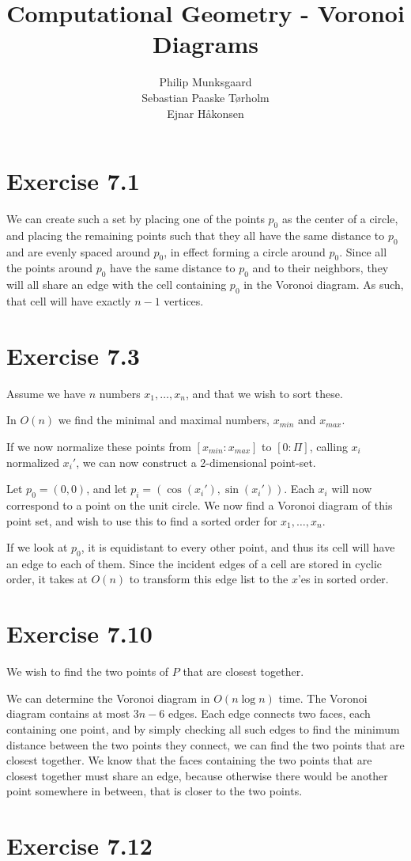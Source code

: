 \documentclass[11pt,a4paper]{article}
\title{Computational Geometry - Voronoi Diagrams}
\author{Philip Munksgaard \\ Sebastian Paaske Tørholm \\ Ejnar Håkonsen}
\begin{document}
\maketitle

\section{Exercise 7.1}

We can create such a set by placing one of the points $p_0$ as the
center of a circle, and placing the remaining points such that they
all have the same distance to $p_0$ and are evenly spaced around
$p_0$, in effect forming a circle around $p_0$. Since all the points
around $p_0$ have the same distance to $p_0$ and to their neighbors,
they will all share an edge with the cell containing $p_0$ in the
Voronoi diagram. As such, that cell will have exactly $n-1$ vertices.

\section{Exercise 7.3}
Assume we have $n$ numbers $x_1, \ldots, x_n$, and that we wish to sort these.

In $O(n)$ we find the minimal and maximal numbers, $x_{min}$
and $x_{max}$.

If we now normalize these points from $[x_{min} : x_{max}]$ to $[0 : \Pi]$, calling
$x_i$ normalized $x_i'$, we can now construct a 2-dimensional point-set.

Let $p_0 = (0,0)$, and let $p_i = (\cos(x_i'), \sin(x_i'))$. Each $x_i$ will
now correspond to a point on the unit circle. We now find a Voronoi diagram of
this point set, and wish to use this to find a sorted order for $x_1, \ldots,
x_n$.

If we look at $p_0$, it is equidistant to every other point, and thus its cell
will have an edge to each of them. Since the incident edges of a cell are
stored in cyclic order, it takes at $O(n)$ to transform this edge list to the
$x$'es in sorted order.

\section{Exercise 7.10}

We wish to find the two points of $P$ that are closest together.

We can determine the Voronoi diagram in $O(n \log n)$ time. The
Voronoi diagram contains at most $3n-6$ edges. Each edge connects two
faces, each containing one point, and by simply checking all such
edges to find the minimum distance between the two points they
connect, we can find the two points that are closest together. We know
that the faces containing the two points that are closest together
must share an edge, because otherwise there would be another point
somewhere in between, that is closer to the two points.

\section{Exercise 7.12}
\end{document}
